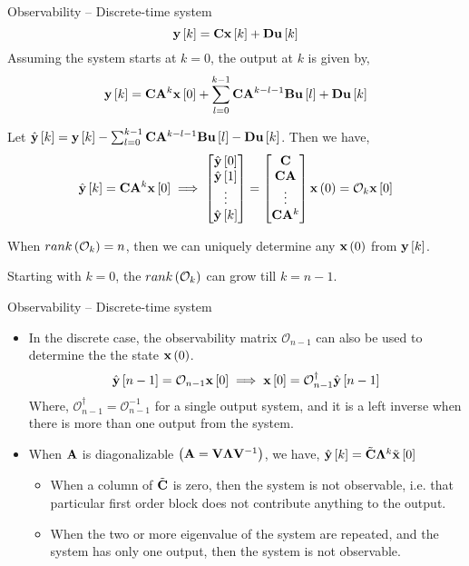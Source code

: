 \documentclass[aspectratio=169]{beamer}
\def\mf{\ensuremath\mathbf}
\def\lp{\ensuremath\left(}
\def\rp{\ensuremath\right)}
\def\ls{\ensuremath\left[}
\def\rs{\ensuremath\right]}
\def\emx{\ensuremath\end{bmatrix*}}
\def\bmxc{\ensuremath\begin{bmatrix*}[c]}
\newcommand{\ct}[1]{\lp #1\rp}
\newcommand{\dt}[1]{\ls #1\rs}
\begin{document}
\begin{frame}{Observability -- Discrete-time system}
\vspace{-0.2cm}
\[ \mf{y}\dt{k} = \mf{C}\mf{x}\dt{k} + \mf{D}\mf{u}\dt{k} \]
Assuming the system starts at $k=0$, the output at $k$ is given by,\vspace{-0.15cm}
\[ \mf{y}\dt{k} = \mf{C}\mf{A}^{k}\mf{x}\dt{0} + \sum_{l=0}^{k-1} \mf{C}\mf{A}^{k-l-1}\mf{B}\mf{u}\dt{l} + \mf{D}\mf{u}\dt{k} \]\vspace{-0.15cm}

Let $\hat{\mf{y}}\dt{k} = \mf{y}\dt{k} - \sum_{l=0}^{k-1} \mf{C}\mf{A}^{k-l-1}\mf{B}\mf{u}\dt{l} - \mf{D}\mf{u}\dt{k}$. Then we have,\vspace{-0.15cm}
\[ \hat{\mf{y}}\dt{k} = \mf{C}\mf{A}^k\mf{x}\dt{0} \implies \bmxc \hat{\mf{y}}\dt{0}\\ \hat{\mf{y}}\dt{1}\\ \vdots \\\hat{\mf{y}}\dt{k} \emx = \bmxc \mf{C} \\ \mf{C}\mf{A} \\ \vdots \\ \mf{C}\mf{A}^{k} \emx \mf{x}\ct{0} = \mathcal{O}_k\mf{x}\dt{0}\]

When $rank\ct{\mathcal{O}_k} = n$, then we can uniquely determine any $\mf{x}\ct{0}$ from $\mf{y}\dt{k}$. 

Starting with $k=0$, the $rank\ct{\mathcal{O}_k}$ can grow till $k = n-1$.
\end{frame}
 
\begin{frame}{Observability -- Discrete-time system}
\begin{itemize}
    \item In the discrete case, the observability matrix $\mathcal{O}_{n-1}$ can also be used to determine the the state $\mf{x}\ct{0}$.
    \[ \hat{\mf{y}}\dt{n-1} = \mathcal{O}_{n-1}\mf{x}\dt{0} \implies \mf{x}\dt{0} = \mathcal{O}_{n-1}^\dagger\hat{\mf{y}}\dt{n-1} \]
    Where, $\mathcal{O}_{n-1}^\dagger = \mathcal{O}_{n-1}^{-1}$ for a single output system, and it is a left inverse when there is more than one output from the system.

    \item When $\mf{A}$ is diagonalizable $\ct{\mf{A} = \mf{V}\mf{\Lambda}\mf{V}^{-1}}$, we have, $\hat{\mf{y}}\dt{k} = \tilde{\mf{C}}\mf{\Lambda}^k\tilde{\mf{x}}\dt{0}$

    \begin{itemize}
        \item When a column of $\tilde{\mf{C}}$ is zero, then the system is not observable, i.e. that particular first order block does not contribute anything to the output.\vspace{0.2cm}

        \item When the two or more eigenvalue of the system are repeated, and the system has only one output, then the system is not observable.
    \end{itemize}
\end{itemize}
\end{frame}
\end{document}
